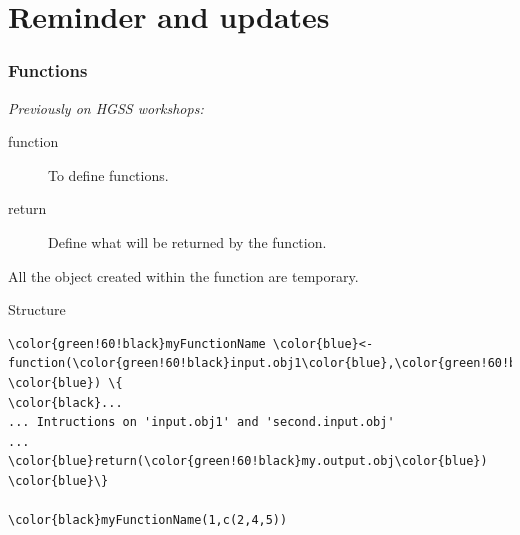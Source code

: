 \documentclass[10pt]{beamer}
\newenvironment{xframe}[2][]
  {\begin{frame}[fragile,environment=xframe,#1]
  \frametitle{#2}}
  {\end{frame}}
\begin{document}

\section{Reminder and updates}

\begin{xframe}{Functions}
  {\it\small Previously on HGSS workshops: }
  \begin{block}{}
    \begin{description}
      \item[function] To define functions.
      \item[return] Define what will be returned by the function. 
    \end{description}
    All the object created within the function are temporary.
    \bigskip
    \end{block}
    \begin{block}{Structure}    
\begin{Verbatim}[commandchars=\\\{\}]
\color{green!60!black}myFunctionName \color{blue}<- function(\color{green!60!black}input.obj1\color{blue},\color{green!60!black}second.input.obj \color{blue}) \{
\color{black}...
... Intructions on 'input.obj1' and 'second.input.obj'
...
\color{blue}return(\color{green!60!black}my.output.obj\color{blue})
\color{blue}\}

\color{black}myFunctionName(1,c(2,4,5))
\end{Verbatim}
  \end{block}
\end{xframe}
\end{document}

